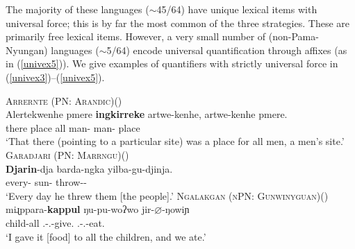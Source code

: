 \documentclass[12pt,egregdoesnotlikesansseriftitles]{scrartcl}
\begin{document}
The majority of these languages ($\sim$45/64)  have unique lexical items with universal force; this is by far the most common of the three strategies. These are primarily free lexical items. However, a very small number of (non-Pama-Nyungan) languages ($\sim$5/64) encode universal quantification  through affixes (as in (\ref{univex5})). We give examples of quantifiers with strictly universal force in (\ref{univex3})--(\ref{univex5}).

\begin{exe}
  \ex  \textsc{Arrernte (PN: Arandic)}\hfill (\citealt[132]{wilkins89})\\
  \gll Alertekwenhe pmere \textbf{ingkirreke} artwe-kenhe, artwe-kenhe pmere.\\
  there place all man-\Poss{} man-\Poss{} place\\
  \glt `That there (pointing to a particular site) was a place for all men, a men's site.' \label{univex3}
  \ex  \textsc{Garadjari (PN: Marrngu)}\hfill (\citealt[48]{sands89}) \\
  \gll \textbf{Djarin}-dja barda-ngka yilba-gu-djinja.\\
  every-\Loc{} sun-\Loc{}   throw-\Fut-\Tpl\\
  \glt `Every day he threw them [the people].' \label{univex4}
  \ex \textsc{Ngalakgan (nPN: Gunwinyguan)}\hfill (\citealt[160]{baker08}) \label{univex5}\\
  \gll  miɻppara-\textbf{kappul}   ŋu-pu-woʔwo      jir-$\varnothing$-ŋowiɲ\\
  child-all \Fsg.\Sarg-\Tpl.\Obj-give.\Pp{} \Fpl.\Sarg-\Third.\Obj-eat.\Pcon\\
  \glt `I gave it [food] to all the children, and we ate.'
\end{exe}
\end{document}
